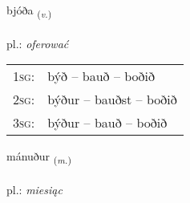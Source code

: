 \documentclass[frontgrid, backgrid]{flacards}\usepackage[]{graphicx}\usepackage[]{xcolor}
\begin{document}
\renewcommand{\blhead}{\vskip5pt {\small\bfseries\footnotesize Sagnorð | Verb }}
\renewcommand{\bcfoot}{\vskip5pt \hspace{2pt}{\small\bfseries\footnotesize 1K}}


{bjóða \small{\textsubscript{(\textit{v.})}} \\[1ex] %
\textphonetic{[pjouːða]} \\
pl.: \emph{oferować} \\  [2ex]
\renewcommand*{\arraystretch}{0.8}
\begin{tabular}{p{1cm}l}
\textsc{1sg}: & býð -- bauð -- boðið \\ 
\textsc{2sg}: & býður -- bauðst -- boðið \\ 
\textsc{3sg}: & býður -- bauð -- boðið \\ 
\end{tabular}
}

\renewcommand{\flhead}{\vskip5pt \fboxsep=0pt {\small\bfseries\footnotesize Nafnorð | Noun}}
\renewcommand{\fcfoot}{\vskip5pt \fboxsep=0pt \hspace{2pt}{\small\bfseries\footnotesize 1K}}

\renewcommand{\blhead}{\vskip5pt {\small\bfseries\footnotesize Nafnorð | Noun }}
\renewcommand{\bcfoot}{\vskip5pt \hspace{2pt}{\small\bfseries\footnotesize 1K}}


{mánuður \small{\textsubscript{(\textit{m.})}} \\[1ex] %
\textphonetic{[mauːnʏðʏr]} \\
pl.: \emph{miesiąc} \\  [2ex]
\renewcommand*{\arraystretch}{0.8}
}

\renewcommand{\flhead}{\vskip5pt \fboxsep=0pt {\small\bfseries\footnotesize Lýsingarorð | Adjective}}
\renewcommand{\fcfoot}{\vskip5pt \fboxsep=0pt \hspace{2pt}{\small\bfseries\footnotesize 1K}}
\end{document}
